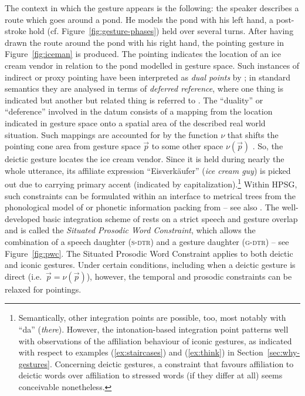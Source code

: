 \documentclass[output=paper
                ,modfonts
                ,nonflat
	        ,collection
	        ,collectionchapter
	        ,collectiontoclongg
 	        ,biblatex
                ,babelshorthands
                ,newtxmath
                ,draftmode
                ,colorlinks, citecolor=brown
]{./langsci/langscibook}
\begin{document}
The context in which the gesture appears is the following: the speaker describes a route which goes around a pond. 
%
He models the pond with his left hand, a post-stroke hold (cf. Figure~\ref{fig:gesture-phases}) held over several turns.
%
After having drawn the route around the pond with his right hand, the pointing gesture in Figure~\ref{fig:iceman} is produced.
%
The pointing indicates the location of an ice cream vendor in relation to the pond modelled in gesture space. 
%
Such instances of indirect or proxy pointing  have been interpreted as \emph{dual points}  by \citet{Goodwin:2003}; in standard semantics they are analysed in terms of \emph{deferred reference},  where one thing is indicated but another but related thing is referred to \citep{Quine:1950,Nunberg:1993}. 
%
The \enquote{duality} or \enquote{deference} involved in the datum consists of a mapping from the location indicated in gesture space onto a spatial area of the described real world situation.
%
Such mappings are accounted for by the function $\nu$ that shifts the pointing cone area from gesture space $\vec{p}$ to some other space $\nu(\vec{p})$ \citep{Lascarides:Stone:2009:a}.
%
So, the deictic gesture locates the ice cream vendor. 
%
Since it is held during nearly the whole utterance, its affiliate expression \enquote{Eisverkäufer} (\textit{ice cream guy}) is picked out due to carrying primary accent (indicated by capitalization).\footnote{Semantically, other integration points are possible, too, most notably with \enquote{da} (\textit{there}). However, the intonation-based integration point patterns well with observations of the affiliation behaviour of iconic gestures, as indicated with respect to examples (\ref{ex:staircases}) and (\ref{ex:think}) in Section~\ref{sec:why-gestures}. Concerning deictic gestures, a constraint that favours affiliation to deictic words over affiliation to stressed words (if they differ at all) seems conceivable nonetheless.}
%
Within HPSG, such constraints can be formulated within an interface to metrical trees from the phonological model of \citet{Klein:2000} or phonetic information packing from \citet{Engdahl:Vallduvi:1996} -- see also .
%
The well-developed basic integration scheme of \citet[]{Alahverdzhieva:Lascarides:Flickinger:2017} rests on a strict speech and gesture overlap and is called the \emph{Situated Prosodic Word Constraint},  which allows the combination of a speech daughter (\textsc{s-dtr})  and a gesture daughter (\textsc{g-dtr})  -- see Figure~\ref{fig:pwc}.
%
The Situated Prosodic Word Constraint applies to both deictic and iconic gestures.
%
Under certain conditions, including when a deictic gesture is direct (i.e.\ $\vec{p} = \nu(\vec{p})$), however, the temporal and prosodic constraints can be relaxed for pointings.  
\end{document}
